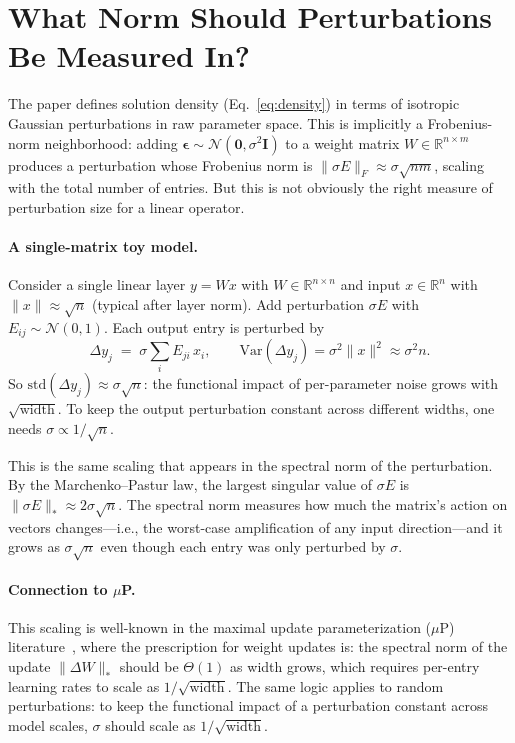 \documentclass[11pt]{article}
\begin{document}
\section{What Norm Should Perturbations Be Measured In?}\label{app:norms}

The paper defines solution density (Eq.~\ref{eq:density}) in terms of isotropic Gaussian perturbations in raw parameter space. This is implicitly a Frobenius-norm neighborhood: adding $\boldsymbol{\epsilon}\sim\mathcal{N}(\mathbf{0},\sigma^2\mathbf{I})$ to a weight matrix $W\in\mathbb{R}^{n\times m}$ produces a perturbation whose Frobenius norm is $\|\sigma E\|_F \approx \sigma\sqrt{nm}$, scaling with the total number of entries. But this is not obviously the right measure of perturbation size for a linear operator.

\paragraph{A single-matrix toy model.} Consider a single linear layer $y = Wx$ with $W\in\mathbb{R}^{n\times n}$ and input $x\in\mathbb{R}^n$ with $\|x\|\approx\sqrt{n}$ (typical after layer norm). Add perturbation $\sigma E$ with $E_{ij}\sim\mathcal{N}(0,1)$. Each output entry is perturbed by
\[
  \Delta y_j \;=\; \sigma\sum_i E_{ji}\, x_i, \qquad \mathrm{Var}(\Delta y_j) = \sigma^2\|x\|^2 \approx \sigma^2 n.
\]
So $\mathrm{std}(\Delta y_j)\approx \sigma\sqrt{n}$: the functional impact of per-parameter noise grows with $\sqrt{\text{width}}$. To keep the output perturbation constant across different widths, one needs $\sigma\propto 1/\sqrt{n}$.

This is the same scaling that appears in the spectral norm of the perturbation. By the Marchenko--Pastur law, the largest singular value of $\sigma E$ is $\|\sigma E\|_*\approx 2\sigma\sqrt{n}$. The spectral norm measures how much the matrix's action on vectors changes---i.e., the worst-case amplification of any input direction---and it grows as $\sigma\sqrt{n}$ even though each entry was only perturbed by $\sigma$.

\paragraph{Connection to $\mu$P.} This scaling is well-known in the maximal update parameterization ($\mu$P) literature~\cite{yang2023spectral}, where the prescription for weight updates is: the spectral norm of the update $\|\Delta W\|_*$ should be $\Theta(1)$ as width grows, which requires per-entry learning rates to scale as $1/\sqrt{\text{width}}$. The same logic applies to random perturbations: to keep the functional impact of a perturbation constant across model scales, $\sigma$ should scale as $1/\sqrt{\text{width}}$.
\end{document}
